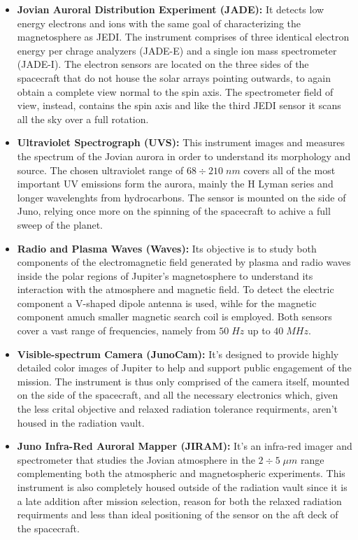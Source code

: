 \begin{itemize}
    \item \textbf{Jovian Auroral Distribution Experiment (JADE):} It detects low energy electrons and ions with the same goal of characterizing the magnetosphere as JEDI. The instrument comprises of three identical electron energy per chrage analyzers (JADE-E) and a single ion mass spectrometer (JADE-I). The electron sensors are located on the three sides of the  spacecraft that do not house the solar arrays pointing outwards, to again obtain a complete view normal to the spin axis. The spectrometer field of view, instead, contains the spin axis and like the third JEDI sensor it scans all the sky over a full rotation.
    
    \item \textbf{Ultraviolet Spectrograph (UVS):} This instrument images and measures the spectrum of the Jovian aurora in order to understand its morphology and source. The chosen ultraviolet range of $68 \div 210 \;nm$ covers all of the most important UV emissions form the aurora, mainly the H Lyman series and longer wavelenghts from hydrocarbons. The sensor is mounted on the side of Juno, relying once more on the spinning of the spacecraft to achive a full sweep of the planet. 
    
    \item \textbf{Radio and Plasma Waves (Waves):} Its objective is to study both components of the electromagnetic field generated by plasma and radio waves inside the polar regions of Jupiter's magnetosphere to understand its interaction with the atmosphere and magnetic field. To detect the electric component a V-shaped dipole antenna is used, wihle for the magnetic component amuch smaller magnetic search coil is employed. Both sensors cover a vast range of frequencies, namely from $50 \;Hz$ up to $40 \;MHz$.

    \item \textbf{Visible-spectrum Camera (JunoCam):} It's designed to provide highly detailed color images of Jupiter to help and support public engagement of the mission. The instrument is thus only comprised of the camera itself, mounted on the side of the spacecraft, and all the necessary electronics which, given the less crital objective and relaxed radiation tolerance requirments, aren't housed in the radiation vault.

    \item \textbf{Juno Infra-Red Auroral Mapper (JIRAM):} It's an infra-red imager and spectrometer that studies the Jovian atmosphere in the \(2 \div 5 \;\mu m\) range complementing both the atmospheric and magnetospheric experiments. This instrument is also completely housed outside of the radiation vault since it is a late addition after mission selection, reason for both the relaxed radiation requirments and less than ideal positioning of the sensor on the aft deck of the spacecraft.
       
\end{itemize}

